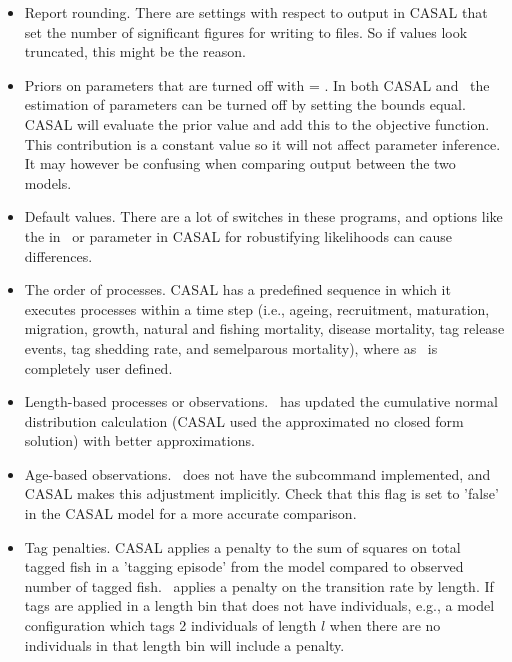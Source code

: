 \begin{itemize}
	\item Report rounding. There are settings with respect to output in CASAL that set the number of significant figures for writing to files. So if values look truncated, this might be the reason.

	\item Priors on parameters that are turned off with  = . In both CASAL and \CNAME\ the estimation of parameters can be turned off by setting the bounds equal. CASAL will evaluate the prior value and add this to the objective function.  This contribution is a constant value so it will not affect parameter inference. It may however be confusing when comparing output between the two models.

	\item Default values. There are a lot of switches in these programs, and options like the  in \CNAME\ or  parameter in CASAL for robustifying likelihoods can cause differences.

	\item The order of processes. CASAL has a predefined sequence in which it executes processes within a time step (i.e., ageing, recruitment, maturation, migration, growth, natural and fishing mortality, disease mortality, tag release events, tag shedding rate, and semelparous mortality), where as \CNAME\ is completely user defined.

	\item Length-based processes or observations. \CNAME\ has updated the cumulative normal distribution calculation (CASAL used the approximated no closed form solution) with better approximations.

	\item Age-based observations. \CNAME\ does not have the  subcommand implemented, and CASAL makes this adjustment implicitly. Check that this flag is set to 'false' in the CASAL model for a more accurate comparison.

	\item Tag penalties. CASAL applies a penalty to the sum of squares on total tagged fish in a 'tagging episode' from the model compared to observed number of tagged fish. \CNAME\ applies a penalty on the transition rate by length. If tags are applied in a length bin that does not have individuals, e.g., a model configuration which tags 2 individuals of length $l$ when there are no individuals in that length bin will include a penalty.
\end{itemize}

